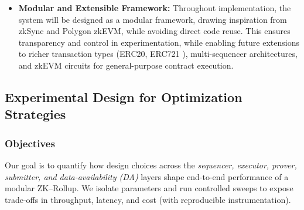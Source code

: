 \begin{itemize}
\item \textbf{Modular and Extensible Framework:} Throughout implementation, the system will be designed as a modular framework, drawing inspiration from zkSync and Polygon zkEVM, while avoiding direct code reuse. This ensures transparency and control in experimentation, while enabling future extensions to richer transaction types (ERC20, ERC721 \cite{vogelsteller2015erc20, vogelsteller2018erc721}), multi-sequencer architectures, and zkEVM circuits for general-purpose contract execution.

\end{itemize}



\subsection{Experimental Design for Optimization Strategies}
\subsubsection{Objectives}

Our goal is to quantify how design choices across the \emph{sequencer, executor, prover, submitter, and data-availability (DA)} layers shape end-to-end performance of a modular ZK–Rollup. We isolate parameters and run controlled sweeps to expose trade-offs in throughput, latency, and cost (with reproducible instrumentation).

